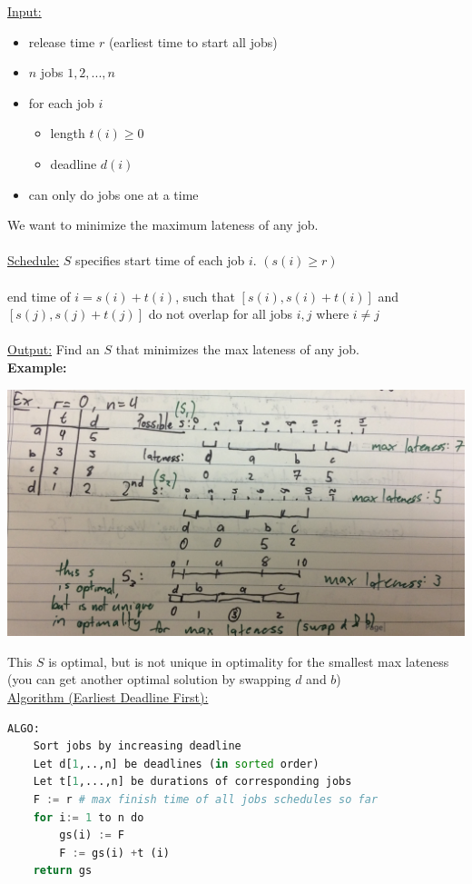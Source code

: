\documentclass[12pt]{article}
\begin{document}
\underline{Input:}
\begin{itemize}
	\item{release time $r$ (earliest time to start all jobs)}
	\item{$n$ jobs $1,2,...,n$}
	\item{for each job $i$}
	\begin{itemize}
		\item{length $t(i) \geq 0$}
		\item{deadline $d(i)$}
	\end{itemize}
	\item{can only do jobs one at a time}
\end{itemize}

We want to minimize the maximum lateness of any job.\\
\\
\underline{Schedule:} $S$ specifies start time of each job $i$. $(s(i) \geq r)$\\
\\
end time of $i = s(i) + t(i)$, such that $[ s(i), s(i)+t(i) ]$ and $[ s(j), s(j)+t(j) ]$ do not overlap for all jobs $i,j$ where $i \neq j$\\
\\
\underline{Output:} Find an $S$ that minimizes the max lateness of any job.\\

\textbf{Example:}

\includegraphics[scale=0.15]{minmax1}

This $S$ is optimal, but is not unique in optimality for the smallest max lateness (you can get another optimal solution by swapping $d$ and $b$)\\

\underline{Algorithm (Earliest Deadline First):}

\begin{lstlisting}[language=Python]
ALGO:
	Sort jobs by increasing deadline
	Let d[1,..,n] be deadlines (in sorted order)
	Let t[1,...,n] be durations of corresponding jobs
	F := r # max finish time of all jobs schedules so far
	for i:= 1 to n do
		gs(i) := F
		F := gs(i) +t (i)
	return gs
\end{lstlisting}
\end{document}

